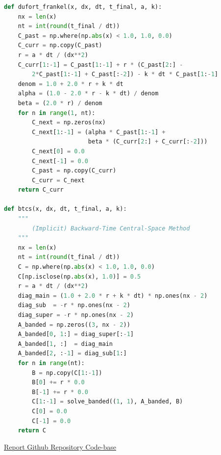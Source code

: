 \begin{lstlisting}[language=Python, title={fdsolvers.py}]
def dufort_frankel(x, dx, dt, t_final, a, k):
    nx = len(x)
    nt = int(round(t_final / dt))
    C_past = np.where(np.abs(x) < 1.0, 1.0, 0.0)
    C_curr = np.copy(C_past)
    r = a * dt / (dx**2)
    C_curr[1:-1] = C_past[1:-1] + r * (C_past[2:] - 
        2*C_past[1:-1] + C_past[:-2]) - k * dt * C_past[1:-1]
    denom = 1.0 + 2.0 * r + k * dt
    alpha = (1.0 - 2.0 * r - k * dt) / denom
    beta = (2.0 * r) / denom
    for n in range(1, nt):
        C_next = np.zeros(nx)
        C_next[1:-1] = (alpha * C_past[1:-1] + 
                        beta * (C_curr[2:] + C_curr[:-2]))
        C_next[0] = 0.0
        C_next[-1] = 0.0
        C_past = np.copy(C_curr)
        C_curr = C_next        
    return C_curr

def btcs(x, dx, dt, t_final, a, k):
    """
        (Implicit) Backward-Time Central-Space Method
    """
    nx = len(x)
    nt = int(round(t_final / dt))    
    C = np.where(np.abs(x) < 1.0, 1.0, 0.0)
    C[np.isclose(np.abs(x), 1.0)] = 0.5
    r = a * dt / (dx**2)    
    diag_main = (1.0 + 2.0 * r + k * dt) * np.ones(nx - 2)
    diag_sub  = -r * np.ones(nx - 2)
    diag_super = -r * np.ones(nx - 2)    
    A_banded = np.zeros((3, nx - 2))
    A_banded[0, 1:] = diag_super[:-1]
    A_banded[1, :]  = diag_main
    A_banded[2, :-1] = diag_sub[1:]    
    for n in range(nt):
        B = np.copy(C[1:-1])        
        B[0] += r * 0.0
        B[-1] += r * 0.0        
        C[1:-1] = solve_banded((1, 1), A_banded, B)        
        C[0] = 0.0
        C[-1] = 0.0        
    return C

\end{lstlisting}

\href{https://github.com/charlielobster/EFDMs-for-the-Reaction-Heat-Diffusion-Equation/}{Report Github Repository Code-base}